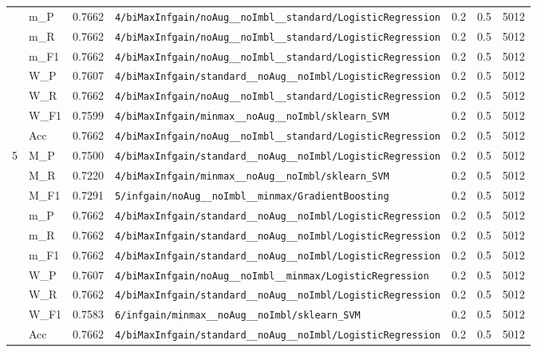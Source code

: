 \begin{table}[htbp]
\begin{tabular}{|c|l|c|>{\ttfamily\footnotesize}p{7.2cm}|c|c|c|}
 & m\_P & 0.7662 & \texttt{4/biMaxInfgain/noAug\_\_noImbl\_\_standard/LogisticRegression} & 0.2 & 0.5  & 5012 \\ 
 & m\_R & 0.7662 & \texttt{4/biMaxInfgain/noAug\_\_noImbl\_\_standard/LogisticRegression} & 0.2 & 0.5  & 5012 \\ 
 & m\_F1 & 0.7662 & \texttt{4/biMaxInfgain/noAug\_\_noImbl\_\_standard/LogisticRegression} & 0.2 & 0.5  & 5012 \\ 
 & W\_P & 0.7607 & \texttt{4/biMaxInfgain/standard\_\_noAug\_\_noImbl/LogisticRegression} & 0.2 & 0.5  & 5012 \\ 
 & W\_R & 0.7662 & \texttt{4/biMaxInfgain/noAug\_\_noImbl\_\_standard/LogisticRegression} & 0.2 & 0.5  & 5012 \\ 
 & W\_F1 & 0.7599 & \texttt{4/biMaxInfgain/minmax\_\_noAug\_\_noImbl/sklearn\_SVM} & 0.2 & 0.5  & 5012 \\ 
 & Acc & 0.7662 & \texttt{4/biMaxInfgain/noAug\_\_noImbl\_\_standard/LogisticRegression} & 0.2 & 0.5  & 5012 \\ 
\hline
\multirow{10}{*}{5} & M\_P & 0.7500 & \texttt{4/biMaxInfgain/standard\_\_noAug\_\_noImbl/LogisticRegression} & 0.2 & 0.5  & 5012 \\ 
 & M\_R & 0.7220 & \texttt{4/biMaxInfgain/minmax\_\_noAug\_\_noImbl/sklearn\_SVM} & 0.2 & 0.5  & 5012 \\ 
 & M\_F1 & 0.7291 & \texttt{5/infgain/noAug\_\_noImbl\_\_minmax/GradientBoosting} & 0.2 & 0.5  & 5012 \\ 
 & m\_P & 0.7662 & \texttt{4/biMaxInfgain/standard\_\_noAug\_\_noImbl/LogisticRegression} & 0.2 & 0.5  & 5012 \\ 
 & m\_R & 0.7662 & \texttt{4/biMaxInfgain/standard\_\_noAug\_\_noImbl/LogisticRegression} & 0.2 & 0.5  & 5012 \\ 
 & m\_F1 & 0.7662 & \texttt{4/biMaxInfgain/standard\_\_noAug\_\_noImbl/LogisticRegression} & 0.2 & 0.5  & 5012 \\ 
 & W\_P & 0.7607 & \texttt{4/biMaxInfgain/noAug\_\_noImbl\_\_minmax/LogisticRegression} & 0.2 & 0.5  & 5012 \\ 
 & W\_R & 0.7662 & \texttt{4/biMaxInfgain/standard\_\_noAug\_\_noImbl/LogisticRegression} & 0.2 & 0.5  & 5012 \\ 
 & W\_F1 & 0.7583 & \texttt{6/infgain/minmax\_\_noAug\_\_noImbl/sklearn\_SVM} & 0.2 & 0.5  & 5012 \\ 
 & Acc & 0.7662 & \texttt{4/biMaxInfgain/standard\_\_noAug\_\_noImbl/LogisticRegression} & 0.2 & 0.5  & 5012 \\ 
\hline
\end{tabular}
\end{table}